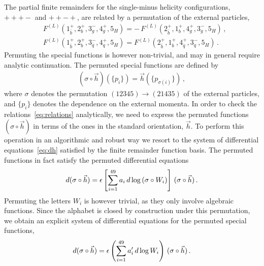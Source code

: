 \documentclass[main.tex]{subfiles}
\begin{document}
The partial finite remainders for the single-minus helicity configurations, $+++-$ and $++-+$, are related by a permutation of the external particles,
\begin{equation} \label{eq:relations}
\begin{aligned} 
 & F^{(L)}(1^+_{\bar{b}},2^+_{b},3^-_g,4^+_g,5_{H}) = - \, F^{(L)}(2^+_{\bar{b}},1^+_{b},4^+_g,3^-_g,5_{H}) \,, \\
 & F^{(L)}(1^+_{\bar{b}},2^+_{b},3^-_{\bar{q}},4^+_q,5_{H}) = F^{(L)}(2^+_{\bar{b}},1^+_{b},4^+_{\bar{q}},3^-_q,5_{H}) \,.
\end{aligned}
\end{equation}
Permuting the special functions is however non-trivial, and may in general require analytic continuation. The permuted special functions are defined by
\begin{align}
\left(\sigma \circ \vec{h} \right) (\{p_i\}) = \vec{h} ( \{p_{\sigma(i)}\} )\, ,
\end{align}
where $\sigma$ denotes the permutation $(12345)\to(21435)$ of the external particles, and $\{p_i\}$ denotes the dependence on the external momenta. In order to check the relations~\eqref{eq:relations} analytically, we need to express the permuted functions $(\sigma \circ \vec{h} )$ in terms of the ones in the standard orientation, $\vec{h}$. To perform this operation in an algorithmic and robust way we resort to the system of differential equations~\eqref{eq:dh} satisfied by the finite remainder function basis. The permuted functions in fact satisfy the permuted differential equations
\begin{align}
d ( \sigma \circ \vec{h} ) = \epsilon \left[ \sum_{i=1}^{49} a_i \, d \log\left(\sigma \circ W_i \right) \right] \,  ( \sigma \circ \vec{h} ) \,.
\end{align}
Permuting the letters $W_i$ is however trivial, as they only involve algebraic functions. Since the alphabet is closed by construction under this permutation, we obtain an explicit system of differential equations for the permuted special functions, 
\begin{align} \label{eq:dsigmah}
d ( \sigma \circ \vec{h} ) = \epsilon \left( \sum_{i=1}^{49} a_i' \, d \log W_i  \right) \,  ( \sigma \circ \vec{h} ) \,.
\end{align}
\end{document}
